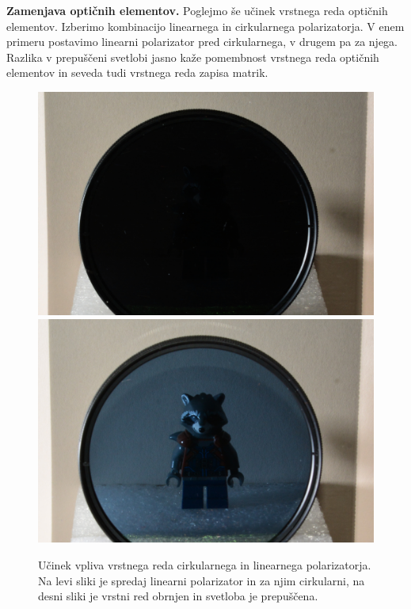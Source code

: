 \begin{example}{\bf Zamenjava optičnih elementov.}
Poglejmo še učinek vrstnega reda optičnih elementov. Izberimo
kombinacijo linearnega in cirkularnega polarizatorja. V enem primeru postavimo
linearni polarizator pred cirkularnega, v drugem pa za njega. Razlika
v prepuščeni svetlobi jasno kaže pomembnost vrstnega reda optičnih
elementov in seveda tudi vrstnega reda zapisa matrik.
\begin{figure}[h!]
\centering
\includegraphics[width=7truecm]{slike/03_vrstnired1.JPG}\hfill
\includegraphics[width=7truecm]{slike/03_vrstnired2.JPG}
\caption{Učinek vpliva vrstnega reda cirkularnega in linearnega polarizatorja.
Na levi sliki je spredaj linearni polarizator in za njim cirkularni, na desni sliki
je vrstni red obrnjen in svetloba je prepuščena.}
\label{fig:03_VrstniRed}
\end{figure}
\end{example}

